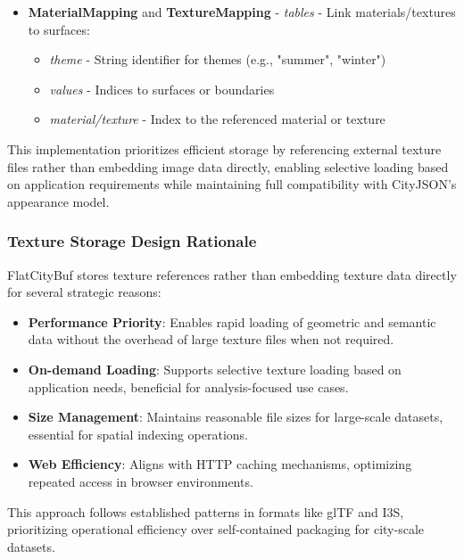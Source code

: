 \begin{itemize}
  \item \textbf{MaterialMapping} and \textbf{TextureMapping} - \textit{tables} - Link materials/textures to surfaces:
    \begin{itemize}
      \item \textit{theme} - String identifier for themes (e.g., "summer", "winter")
      \item \textit{values} - Indices to surfaces or boundaries
      \item \textit{material/texture} - Index to the referenced material or texture
    \end{itemize}
\end{itemize}

This implementation prioritizes efficient storage by referencing external texture files rather than embedding image data directly, enabling selective loading based on application requirements while maintaining full compatibility with CityJSON's appearance model.

\subsubsection{Texture Storage Design Rationale}
\label{methodology:feature_encoding:textures:rationale}

FlatCityBuf stores texture references rather than embedding texture data directly for several strategic reasons:

\begin{itemize}
  \item \textbf{Performance Priority}: Enables rapid loading of geometric and semantic data without the overhead of large texture files when not required.

  \item \textbf{On-demand Loading}: Supports selective texture loading based on application needs, beneficial for analysis-focused use cases.

  \item \textbf{Size Management}: Maintains reasonable file sizes for large-scale datasets, essential for spatial indexing operations.

  \item \textbf{Web Efficiency}: Aligns with HTTP caching mechanisms, optimizing repeated access in browser environments.
\end{itemize}

This approach follows established patterns in formats like glTF and I3S, prioritizing operational efficiency over self-contained packaging for city-scale datasets.

